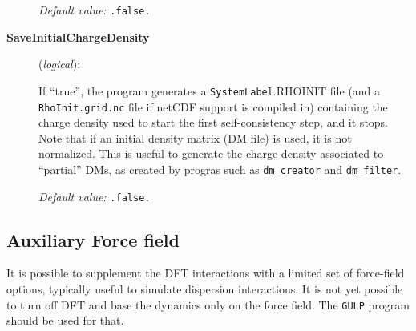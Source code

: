 \documentclass[11pt]{article}
\begin{document}
\begin{description}
{\it Default value:} {\tt .false.}


\item[{\bf SaveInitialChargeDensity}] ({\it logical}):

  If ``true'', the program generates a {\tt SystemLabel}.RHOINIT file
  (and a {\tt RhoInit.grid.nc} file if netCDF support is compiled in)
  containing the charge density used to start the first
  self-consistency step, and it stops. Note that if an initial density
  matrix (DM file) is used, it is not normalized. This is useful to
  generate the charge density associated to ``partial'' DMs, as
  created by progras such as {\tt dm\_creator} and {\tt dm\_filter}.

{\it Default value:} {\tt .false.}


\end{description}

\vspace{5pt}
\subsection{Auxiliary Force field}

It is possible to supplement the DFT interactions with a limited
set of force-field options, typically useful to simulate dispersion
interactions. It is not yet possible to turn off DFT and base the
dynamics only on the force field. The {\tt GULP} program should be
used for that.
\end{document}
